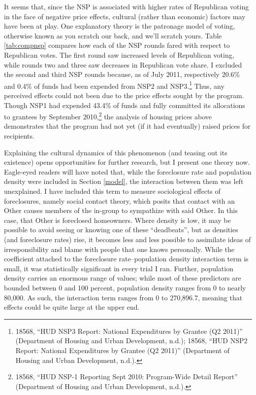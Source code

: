 \documentclass[12pt,oneside]{psthesis}
\begin{document}
It seems that, since the NSP is associated with higher rates of Republican voting in the face of negative price effects, cultural (rather than economic) factors may have been at play.
One explanatory theory is the patronage model of voting, otherwise known as you scratch our back, and we'll scratch yours.
Table \ref{tab:compnsp} compares how each of the NSP rounds fared with respect to Republican votes.
The first round saw increased levels of Republican voting, while rounds two and three saw decreases in Republican vote share.
I excluded the second and third NSP rounds because, as of July 2011, respectively 20.6\% and 0.4\% of funds had been expended from NSP2 and NSP3.\footnote{18568, ``HUD NSP3 Report: National Expenditures by Grantee (Q2 2011)'' (Department of Housing and Urban Development, n.d.); 18568, ``HUD NSP2 Report: National Expenditures by Grantee (Q2 2011)'' (Department of Housing and Urban Development, n.d.).}
Thus, any perceived effects could not been due to the price effects sought by the program.
Though NSP1 had expended 43.4\% of funds and fully committed its allocations to grantees by September 2010,\footnote{18568, ``HUD NSP-1 Reporting Sept 2010: Program-Wide Detail Report'' (Department of Housing and Urban Development, n.d.).} the analysis of housing prices above demonstrates that the program had not yet (if it had eventually) raised prices for recipients.

Explaining the cultural dynamics of this phenomenon (and teasing out its existence) opens opportunities for further research, but I present one theory now.
Eagle-eyed readers will have noted that, while the foreclosure rate and population density were included in Section \ref{model}, the interaction between them was left unexplained.
I have included this term to measure sociological effects of foreclosures, namely social contact theory, which posits that contact with an Other causes members of the in-group to sympathize with said Other.
In this case, that Other is foreclosed homeowners.
Where density is low, it may be possible to avoid seeing or knowing one of these ``deadbeats'', but as densities (and foreclosure rates) rise, it becomes less and less possible to assimilate ideas of irresponsibility and blame with people that one knows personally.
While the coefficient attached to the foreclosure rate--population density interaction term is small, it was statistically significant in every trial I ran.
Further, population density carries an enormous range of values; while most of these predictors are bounded between 0 and 100 percent, population density ranges from 0 to nearly 80,000.
As such, the interaction term ranges from 0 to 270,896.7, meaning that effects could be quite large at the upper end.
\end{document}
